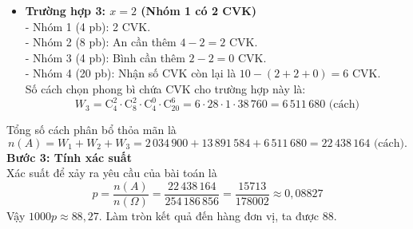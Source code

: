 \begin{ex}
{\begin{itemize}
			\item \textbf{Trường hợp 3: $x = 2$ (Nhóm 1 có 2 CVK)}\\
			- Nhóm 1 (4 pb): 2 CVK.\\
			- Nhóm 2 (8 pb): An cần thêm $4 - 2 = 2$ CVK.\\
			- Nhóm 3 (4 pb): Bình cần thêm $2 - 2 = 0$ CVK.\\
			- Nhóm 4 (20 pb): Nhận số CVK còn lại là $10 - (2+2+0) = 6$ CVK.\\
			Số cách chọn phong bì chứa CVK cho trường hợp này là:
			$$W_3 = \mathrm{C}_4^2 \cdot \mathrm{C}_8^2 \cdot \mathrm{C}_4^0 \cdot \mathrm{C}_{20}^6 = 6 \cdot 28 \cdot 1 \cdot 38\,760 = 6\,511\,680 \text{ (cách)}$$
		\end{itemize}
		Tổng số cách phân bổ thỏa mãn là
		$$n(A) = W_1 + W_2 + W_3 = 2\,034\,900 + 13\,891\,584 + 6\,511\,680 = 22\,438\,164 \text{ (cách)}.$$
		\textbf{Bước 3: Tính xác suất}\\
		Xác suất để xảy ra yêu cầu của bài toán là
		$$p = \dfrac{n(A)}{n(\Omega)} = \dfrac{22\,438\,164}{254\,186\,856} = \dfrac{15713}{178002} \approx 0,08827$$
		Vậy $1000p \approx 88,27$. Làm tròn kết quả đến hàng đơn vị, ta được $\boxed{88}$.
	}
\end{ex}